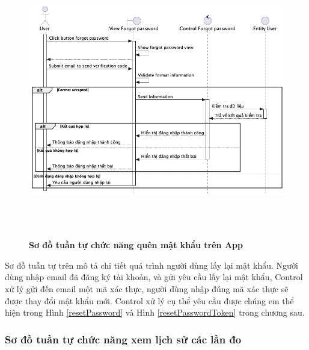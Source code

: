   \begin{figure}[H]
        \centering
        \includegraphics[width=16cm,height=12cm]{Images/mobile_app/forgot_password.png}
        \caption[Sơ đồ tuần tự chức năng quên mật khẩu trên App]{\bfseries \fontsize{12pt}{0pt}
        \selectfont Sơ đồ tuần tự chức năng quên mật khẩu trên App}
        \label{forgot_password} %
  \end{figure}

    Sơ đồ tuần tự trên mô tả chi tiết quá trình người dùng lấy lại mật khẩu. Người dùng nhập email đã đăng ký tài khoản,
  và gửi yêu cầu lấy lại mật khẩu, Control xử lý gửi đến email một mã xác thực, người dùng nhập đúng mã xác thực sẽ được thay
  đổi mật khẩu mới. Control xử lý cụ thể yêu cầu được chúng em thể hiện trong Hình \ref{resetPassword} và Hình \ref{resetPasswordToken} trong chương sau.

\subsubsection{Sơ đồ tuần tự chức năng xem lịch sử các lần đo}

